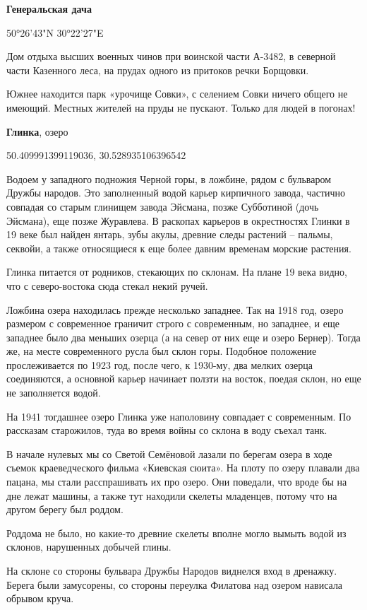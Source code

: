 \textbf{Генеральская дача} 

50°26'43"N 30°22'27"E

Дом отдыха высших военных чинов при воинской части А-3482, в северной части Казенного леса, на прудах одного из притоков речки Борщовки.

Южнее находится парк «урочище Совки», с селением Совки ничего общего не имеющий. Местных жителей на пруды не пускают. Только для людей в погонах!\\

\medskip

\textbf{Глинка}, озеро

50.409991399119036, 30.528935106396542

Водоем у западного подножия Черной горы, в ложбине, рядом с бульваром Дружбы народов. Это заполненный водой карьер кирпичного завода, частично совпадая со старым глинищем завода Эйсмана, позже Субботиной (дочь Эйсмана), еще позже Журавлева. В раскопах карьеров в окрестностях Глинки в 19 веке был найден янтарь, зубы акулы, древние следы растений – пальмы, секвойи, а также относящиеся к еще более давним временам морские растения. 

Глинка питается от родников, стекающих по склонам. На плане 19 века видно, что с северо-востока сюда стекал некий ручей.

Ложбина озера находилась прежде несколько западнее. Так на 1918 год, озеро размером с современное граничит строго с современным, но западнее, и еще западнее было два меньших озерца (а на север от них еще и озеро Бернер). Тогда же, на месте современного русла был склон горы. Подобное положение прослеживается по 1923 год, после чего, к 1930-му, два мелких озерца соединяются, а основной карьер начинает ползти на восток, поедая склон, но еще не заполняется водой.

На 1941 тогдашнее озеро Глинка уже наполовину совпадает с современным. По рассказам старожилов, туда во время войны со склона в воду съехал танк.

В начале нулевых мы со Светой Семёновой лазали по берегам озера в ходе съемок краеведческого фильма «Киевская сюита». На плоту по озеру плавали два пацана, мы стали расспрашивать их про озеро. Они поведали, что вроде бы на дне лежат машины, а также тут находили скелеты младенцев, потому что на другом берегу был роддом.

Роддома не было, но какие-то древние скелеты вполне могло вымыть водой из склонов, нарушенных добычей глины.

На склоне со стороны бульвара Дружбы Народов виднелся вход в дренажку. Берега были замусорены, со стороны переулка Филатова над озером нависала обрывом круча.

